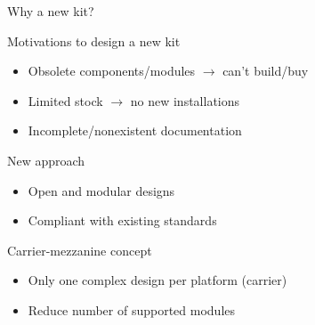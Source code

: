 \documentclass[compress,red]{beamer}
\begin{document}
\begin{frame}{Why a new kit?}

  \begin{block}{Motivations to design a new kit}
    \begin{itemize}
    \item Obsolete components/modules $\rightarrow$ can't build/buy
    \item Limited stock $\rightarrow$ no new installations
    \item Incomplete/nonexistent documentation
    \end{itemize}
  \end{block}

  \begin{block}{New approach}
    \begin{itemize}
    \item Open and modular designs
    \item Compliant with existing standards
    \end{itemize}
  \end{block}

  \begin{block}{Carrier-mezzanine concept}
    \begin{itemize}
    \item Only one complex design per platform (carrier)
    \item Reduce number of supported modules
    \end{itemize}
  \end{block}


\end{frame}
\end{document}

